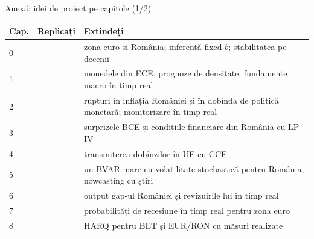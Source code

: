 \begin{frame}{Anexă: idei de proiect pe capitole (1/2)}
\hypertarget{atsapp1}{}
\itemsize{\small}
\begin{center}
\scriptsize
\begin{tabular}{l>{\raggedright\arraybackslash}p{5.0cm}>{\raggedright\arraybackslash}p{6.6cm}}
\toprule
\textbf{Cap.} & \textbf{Replicați} & \textbf{Extindeți} \\
\midrule
0 & {} & zona euro și România; inferență fixed-$b$; stabilitatea pe decenii \\
1 & {} & monedele din ECE, prognoze de densitate, fundamente macro în timp real \\
2 & {} & rupturi în inflația României și în dobînda de politică monetară; monitorizare în timp real \\
3 & {} & surprizele BCE și condițiile financiare din România cu LP-IV \\
4 & {} & transmiterea dobînzilor în UE cu CCE \\
5 & {} & un BVAR mare cu volatilitate stochastică pentru România, nowcasting cu știri \\
6 & {} & output gap-ul României și revizuirile lui în timp real \\
7 & {} & probabilități de recesiune în timp real pentru zona euro \\
8 & {} & HARQ pentru BET și EUR/RON cu măsuri realizate \\
\bottomrule
\end{tabular}
\end{center}
\end{frame}

